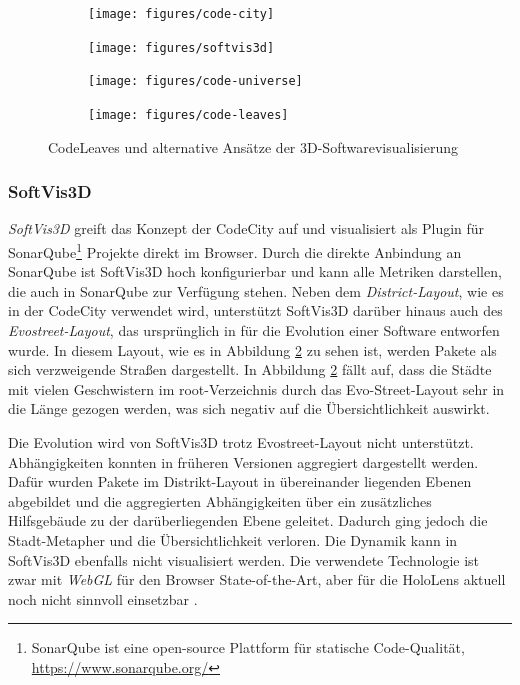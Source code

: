 \newlength\fwidth
\setlength{\fwidth}{.49\textwidth}
\begin{figure}[htb]
  \centering
  \begin{subfigure}[b]{\fwidth}
   \texttt{[image: figures/code-city]}
    \label{fig:code-city}
  \end{subfigure}
  \hfill
  \begin{subfigure}[b]{\fwidth}
  	\texttt{[image: figures/softvis3d]}
  	 \label{fig:softvis3d}
  \end{subfigure}
  \hfill
  \vspace{1em}
  \begin{subfigure}[b]{\fwidth}
  	\texttt{[image: figures/code-universe]}
  	 \label{fig:code-universe}
  \end{subfigure}
  \hfill
  \begin{subfigure}[b]{\fwidth}
  	\texttt{[image: figures/code-leaves]}
  	 \label{fig:code-leaves}
  \end{subfigure}
  \caption{CodeLeaves und alternative Ansätze der 3D-Softwarevisualisierung} \label{fig:alternatives}
\end{figure}

\subsubsection*{SoftVis3D}
\textit{SoftVis3D} greift das Konzept der CodeCity auf und visualisiert als Plugin für SonarQube\footnote{SonarQube ist eine open-source Plattform für statische Code-Qualität, \url{https://www.sonarqube.org/}} Projekte direkt im Browser. Durch die direkte Anbindung an SonarQube ist SoftVis3D hoch konfigurierbar und kann alle Metriken darstellen, die auch in SonarQube zur Verfügung stehen. Neben dem \emph{District-Layout}, wie es in der CodeCity verwendet wird, unterstützt SoftVis3D darüber hinaus auch des \emph{Evostreet-Layout}, das ursprünglich in \cite{steinbruckner2013consistent} für die Evolution einer Software entworfen wurde. In diesem Layout, wie es in Abbildung \ref{fig:softvis3d} zu sehen ist, werden Pakete als sich verzweigende Straßen dargestellt. In Abbildung \ref{fig:softvis3d} fällt auf, dass die Städte mit vielen Geschwistern im root-Verzeichnis durch das Evo-Street-Layout sehr in die Länge gezogen werden, was sich negativ auf die Übersichtlichkeit auswirkt.

Die Evolution wird von SoftVis3D trotz Evostreet-Layout nicht unterstützt. Abhängigkeiten konnten in früheren Versionen aggregiert dargestellt werden. Dafür wurden Pakete im Distrikt-Layout in übereinander liegenden Ebenen abgebildet und die aggregierten Abhängigkeiten über ein zusätzliches Hilfsgebäude zu der darüberliegenden Ebene geleitet. Dadurch ging jedoch die Stadt-Metapher und die Übersichtlichkeit verloren. Die Dynamik kann in SoftVis3D ebenfalls nicht visualisiert werden. Die verwendete Technologie ist zwar mit \emph{WebGL} für den Browser State-of-the-Art, aber für die HoloLens aktuell noch nicht sinnvoll einsetzbar \cite{puetz2017softwarevisualisierung}.

